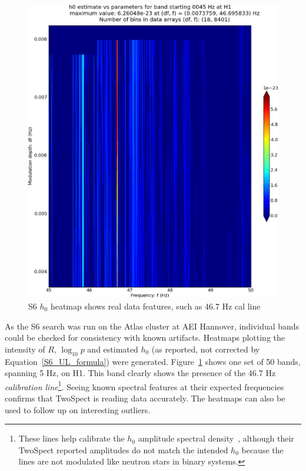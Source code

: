 \begin{figure}
\begin{center}
\includegraphics[width=0.68\paperwidth,height=0.48\paperheight]{plots/DFvsFresultsh0-H1_pulsar-0045.eps}
\caption{
S6 $h_0$ heatmap shows real data features, such as 46.7 Hz cal line}
\label{S6_cal_line_heatmap}
\end{center}
\end{figure}

As the S6 search was run on the Atlas cluster at AEI Hannover, individual bands could be checked for consistency with known artifacts.
Heatmaps plotting the intensity of $R$, $\log_{10}p$ and estimated $h_0$ (as reported, not corrected by Equation~\ref{S6_UL_formula}) were generated.
Figure~\ref{S6_cal_line_heatmap} shows one set of 50 bands, spanning 5 Hz, on H1.
This band clearly shows the presence of the 46.7 Hz \textit{calibration line}\footnote{These lines help calibrate the $h_0$ amplitude spectral density~\cite{MeadorsFeedforward2014}, although their TwoSpect reported amplitudes do not match the intended $h_0$ because the lines are not modulated like neutron stars in binary systems.}.
Seeing known spectral features at their expected frequencies confirms that TwoSpect is reading data accurately. 
The heatmaps can also be used to follow up on interesting outliers.

